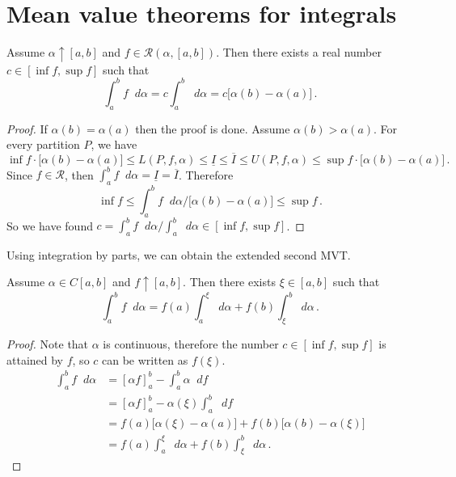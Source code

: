 \documentclass{article}
\newcommand{\upI}{\overline{I}}
\newcommand{\lowI}{\underline{I}}
\newcommand{\Riemann}{\mathcal R}
\newcommand{\dd}{\mathop{}\!d}
\newcommand{\increasing}{\uparrow}
\begin{document}
\section{Mean value theorems for integrals}
\begin{theorem}
    Assume $ \alpha \increasing [a, b] $ and $ f \in \Riemann(\alpha, [a, b]) $. Then there exists a real number $ c \in [\inf f, \sup f] $ such that
    \[ 
        \int_a^b f \dd \alpha = c \int_a^b \dd \alpha = c \big[ \alpha(b) - \alpha(a) \big]  \,.
    \]
\end{theorem}

\begin{proof}
    If $ \alpha(b) = \alpha(a) $ then the proof is done. Assume $ \alpha(b) > \alpha(a) $. For every partition $ P $, we have
    \[ 
        \inf f \cdot \big[ \alpha(b) - \alpha(a) \big] \leqslant L(P, f, \alpha) \leqslant \lowI \leqslant \upI \leqslant U(P, f, \alpha) \leqslant \sup f \cdot \big[ \alpha(b) - \alpha(a) \big] \,.
    \]
    Since $ f \in \Riemann $, then $ \int_a^b f \dd \alpha = \lowI = \upI $. Therefore
    \[ 
        \inf f \leqslant \int_a^b f \dd \alpha / \big[ \alpha(b) - \alpha(a) \big] \leqslant \sup f \,.
    \]
    So we have found $ c = \int_a^b f \dd \alpha / \int_a^b \dd \alpha \in [\inf f, \sup f] $.
\end{proof}

Using integration by parts, we can obtain the extended second MVT.
\begin{theorem}
    Assume $ \alpha \in C[a, b] $ and $ f \increasing [a, b] $. Then there exists $ \xi \in [a, b] $ such that
    \[ 
        \int_a^b f \dd \alpha = f(a) \int_a^\xi \dd \alpha + f(b) \int_\xi^b \dd \alpha \,.
    \]
\end{theorem}

\begin{proof} 
    Note that $ \alpha $ is continuous, therefore the number $ c \in [\inf f, \sup f] $ is attained by $ f $, so $ c $ can be written as $ f(\xi) $.
    \begin{align*}
        \int_a^b f \dd \alpha &= [\alpha f]_a^b - \int_a^b \alpha \dd f \\
        &= [\alpha f]_a^b - \alpha(\xi) \int_a^b \dd f \\
        &= f(a) \big[ \alpha(\xi) - \alpha(a) \big] + f(b) \big[ \alpha(b) - \alpha(\xi) \big] \\
        &= f(a) \int_a^\xi \dd \alpha + f(b) \int_\xi^b \dd \alpha \,.
    \end{align*}
\end{proof}
\end{document}
